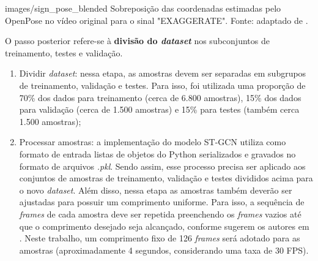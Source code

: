     {images/sign_pose_blended}
    {Sobreposição das coordenadas estimadas pelo OpenPose no vídeo original para o sinal "EXAGGERATE". Fonte: adaptado de \cite{athitsos-asllvd-2008}.}

O passo posterior refere-se à \textbf{divisão do \textit{dataset}} nos subconjuntos de treinamento, testes e validação. 


\begin{enumerate}
    \item Dividir \textit{dataset}: nessa etapa, as amostras devem ser separadas em subgrupos de treinamento, validação e testes. Para isso, foi utilizada uma proporção de 70\% dos dados para treinamento (cerca de 6.800 amostras), 15\% dos dados para validação (cerca de 1.500 amostras) e 15\% para testes (também cerca 1.500 amostras);
    \item Processar amostras: a implementação do modelo ST-GCN utiliza como formato de entrada listas de objetos do Python serializados e gravados no formato de arquivos \textit{.pkl}. Sendo assim, esse processo precisa ser aplicado aos conjuntos de amostras de treinamento, validação e testes divididos acima para o novo \textit{dataset}. Além disso, nessa etapa as amostras também deverão ser ajustadas para possuir um comprimento uniforme. Para isso, a sequência de \textit{frames} de cada amostra deve ser repetida preenchendo os \textit{frames} vazios até que o comprimento desejado seja alcançado, conforme sugerem os autores em \cite{st-gcn-2018}. Neste trabalho, um comprimento fixo de 126 \textit{frames} será adotado para as amostras (aproximadamente 4 segundos, considerando uma taxa de 30 FPS).
\end{enumerate}




